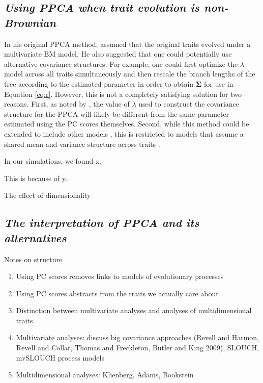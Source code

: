\documentclass[a4paper,12pt]{article}
\begin{document}
\subsection{\emph{Using PPCA when trait evolution is non-Brownian}}
In his original PPCA method, \citet{Revell2008} assumed that the original traits evolved under a multivariate BM model. He also suggested that one could potentially use alternative covariance structures. For example, one could first optimize the $\lambda$ model \citep{Pagel1999} across all traits simultaneously \citep[using the method of][]{Freckleton2002} and then rescale the branch lengths of the tree according to the estimated parameter in order to obtain $\mathbf{\Sigma}$ for use in Equation \ref{eq:r}. However, this is not a completely satisfying solution for two reasons. First, as noted by \citet{Revell2008}, the value of $\lambda$ used to construct the covariance structure for the PPCA will likely be different from the same parameter estimated using the PC scores themselves. Second, while this method could be extended to include other models \citep{ButlerKing2009, motmot}, this is restricted to models that assume a shared mean and variance structure across traits \citep[see][for examples where this does not  apply]{Hansen2008, Bartoszek2013}.

In our simulations, we found x.

This is because of y.

The effect of dimensionality

\subsection{\emph{The interpretation of PPCA and its alternatives}}

Notes on structure
\begin{enumerate}
\item Using PC scores removes links to models of evolutionary processes
\item Using PC scores abstracts from the traits we actually care about
\item Distinction between multivariate analyses and analyses of multidimensional traits
\item Multivariate analyses: discuss big covariance approaches (Revell and Harmon, Revell and Collar, Thomas and Freckleton, Butler and King 2009), SLOUCH, mvSLOUCH process models
\item Multidimensional analyses: Klienberg, Adams, Bookstein
\end{enumerate}
\end{document}
